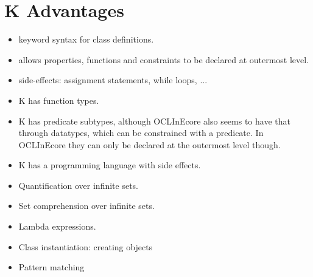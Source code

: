 
\section{K Advantages}
\label{sec:kpros}

\begin{itemize}
  \item keyword syntax for class definitions.
  \item allows properties, functions and constraints to be declared at outermost level.
  \item side-effects: assignment statements, while loops, ...
  \item K has function types.
  \item K has predicate subtypes, although OCLInEcore also seems
    to have that through datatypes, which can be constrained
    with a predicate. In OCLInEcore they can only be declared 
    at the outermost level though.
  \item K has a programming language with side effects.
  \item Quantification over infinite sets.
  \item Set comprehension over infinite sets.
  \item Lambda expressions.
  \item Class instantiation: creating objects
  \item Pattern matching
\end{itemize}